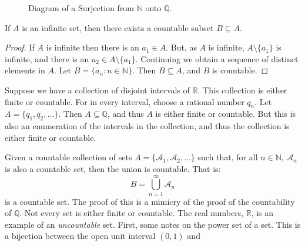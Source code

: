         \begin{figure}[H]
            \centering
            \captionsetup{type=figure}
            \resizebox{\textwidth}{!}{%
                
            }
            \caption{Diagram of a Surjection from
                     $\mathbb{N}$ onto $\mathbb{Q}$.}
            \label{fig:Bijection_N_and_Q}
        \end{figure}
        \begin{theorem}
            If $A$ is an infinite set, then there exists a
            countable subset $B\subseteq{A}$.
        \end{theorem}
        \begin{proof}
            If $A$ is infinite then there is an
            $a_{1}\in{A}$. But, as $A$ is infinite,
            $A\setminus\{a_{1}\}$ is infinite, and there
            is an $a_{2}\in{A}\setminus\{a_{1}\}$. Continuing
            we obtain a sequence of distinct elements in $A$.
            Let $B=\{a_{n}:n\in\mathbb{N}\}$. Then
            $B\subseteq{A}$, and $B$ is countable.
        \end{proof}
        \begin{lexample}
            Suppose we have a collection of disjoint intervals
            of $\mathbb{R}$. This collection is either finite
            or countable. For in every interval, choose a
            rational number $q_{n}$. Let
            $A=\{q_{1},q_{2},\hdots\}$. Then
            $A\subseteq\mathbb{Q}$, and thus $A$ is either
            finite or countable. But this is also an enumeration
            of the intervals in the collection, and thus the
            collection is either finite or countable.
        \end{lexample}
        Given a countable collection of sets
        $A=\{\mathcal{A}_{1},\mathcal{A}_{2},\hdots\}$ such
        that, for all $n\in\mathbb{N}$, $\mathcal{A}_{n}$ is
        also a countable set, then the union is countable. That is:
        \begin{equation}
            B=\bigcup_{n=1}^{\infty}\mathcal{A}_{n}
        \end{equation}
        is a countable set. The proof of this is a mimicry of
        the proof of the countability of $\mathbb{Q}$. Not
        every set is either finite or countable. The real numbers,
        $\mathbb{R}$, is an example of an \textit{uncountable}
        set. First, some notes on the power set of a set.
        This is a bijection between the open unit interval $(0,1)$ and
